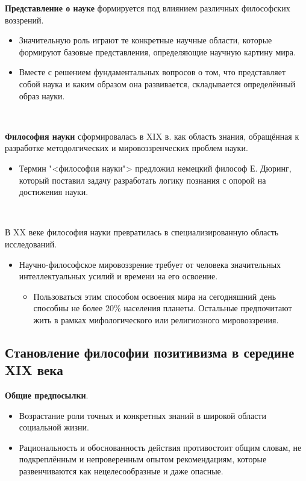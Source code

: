 \documentclass[main.tex]{subfiles}
\begin{document}
{\parindent0pt
\textbf{Представление о науке} формируется под влиянием различных философских воззрений.
\begin{itemize}[nosep,leftmargin=0.5cm]
\item Значительную роль играют те конкретные научные области, которые формируют базовые представления, определяющие научную картину мира.
\item Вместе с решением фундаментальных вопросов о том, что представляет собой наука и каким образом она развивается, складывается определённый образ науки.
\end{itemize}
}
\ 

{\parindent0pt
\textbf{Философия науки} сформировалась в XIX в. как область знания, обращённая к разработке методолгических и мировоззренческих проблем науки.
\begin{itemize}[nosep,leftmargin=0.5cm]
\item Термин "<философия науки"> предложил немецкий философ Е. Дюринг, который поставил задачу разработать логику познания с опорой на достижения науки.
\end{itemize}
}
\ 

{\parindent0pt
В XX веке философия науки превратилась в специализированную область исследований.
\begin{itemize}[nosep,leftmargin=0.5cm]
\item Научно-философское мировоззрение требует от человека значительных интеллектуальных усилий и времени на его освоение.
\begin{itemize}[nosep,leftmargin=0.6cm]
\item Пользоваться этим способом освоения мира на сегодняшний день способны не более 20\% населения планеты.
Остальные предпочитают жить в рамках мифологического или религиозного мировоззрения.
\end{itemize}
\end{itemize}
}



\subsection{Становление философии позитивизма в середине XIX века}

{\parindent0pt
\textbf{Общие предпосылки}.
\begin{itemize}[nosep,leftmargin=0.5cm]
\item Возрастание роли точных и конкретных знаний в широкой области социальной жизни.
\item Рациональность и обоснованность действия противостоит общим словам, не подкреплённым и непроверенным опытом рекомендациям, которые развенчиваются как нецелесообразные и даже опасные.
\end{itemize}
}
\ 
\end{document}
